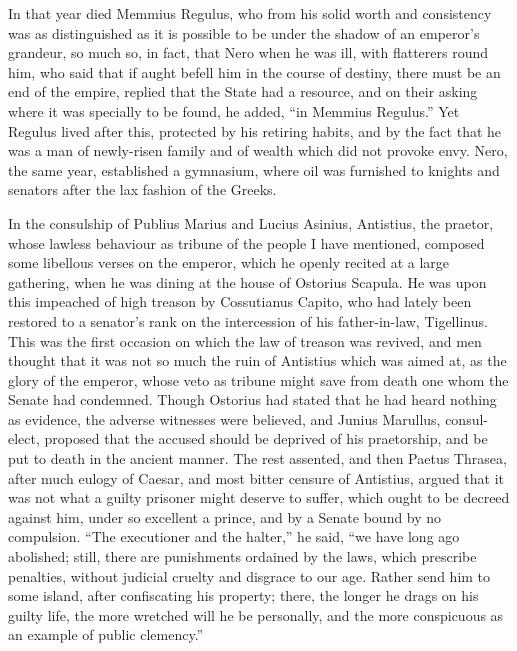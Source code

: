 
In that year died Memmius Regulus, who from his solid worth and consistency was as distinguished as it is possible to be under the shadow of an emperor's grandeur, so much so, in fact, that Nero when he was ill, with flatterers round him, who said that if aught befell him in the course of destiny, there must be an end of the empire, replied that the State had a resource, and on their asking where it was specially to be found, he added, ``in Memmius Regulus.'' Yet Regulus lived after this, protected by his retiring habits, and by the fact that he was a man of newly-risen family and of wealth which did not provoke envy. Nero, the same year, established a gymnasium, where oil was furnished to knights and senators after the lax fashion of the Greeks.


In the consulship of Publius Marius and Lucius Asinius, Antistius, the praetor, whose lawless behaviour as tribune of the people I have mentioned, composed some libellous verses on the emperor, which he openly recited at a large gathering, when he was dining at the house of Ostorius Scapula. He was upon this impeached of high treason by Cossutianus Capito, who had lately been restored to a senator's rank on the intercession of his father-in-law, Tigellinus. This was the first occasion on which the law of treason was revived, and men thought that it was not so much the ruin of Antistius which was aimed at, as the glory of the emperor, whose veto as tribune might save from death one whom the Senate had condemned. Though Ostorius had stated that he had heard nothing as evidence, the adverse witnesses were believed, and Junius Marullus, consul-elect, proposed that the accused should be deprived of his praetorship, and be put to death in the ancient manner. The rest assented, and then Paetus Thrasea, after much eulogy of Caesar, and most bitter censure of Antistius, argued that it was not what a guilty prisoner might deserve to suffer, which ought to be decreed against him, under so excellent a prince, and by a Senate bound by no compulsion. ``The executioner and the halter,'' he said, ``we have long ago abolished; still, there are punishments ordained by the laws, which prescribe penalties, without judicial cruelty and disgrace to our age. Rather send him to some island, after confiscating his property; there, the longer he drags on his guilty life, the more wretched will he be personally, and the more conspicuous as an example of public clemency.''

